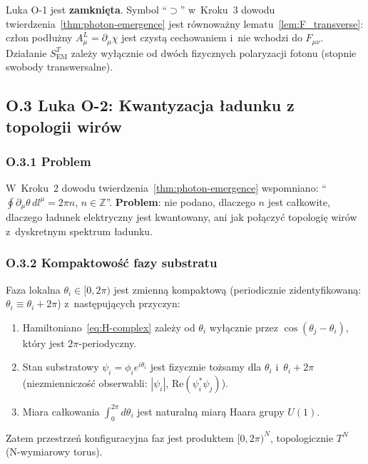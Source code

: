 \begin{uwaga}
Luka O-1 jest \textbf{zamknięta}. Symbol ``$\supset$'' w~Kroku~3
dowodu twierdzenia~\ref{thm:photon-emergence} jest równoważny
lematu~\ref{lem:F_transverse}: człon podłużny $A_\mu^L = \partial_\mu\chi$
jest czystą cechowaniem i~nie wchodzi do $F_{\mu\nu}$.
Działanie $S_\mathrm{EM}^T$ zależy wyłącznie od dwóch fizycznych
polaryzacji fotonu (stopnie swobody transwersalne).
\end{uwaga}

\subsection*{O.3 Luka O-2: Kwantyzacja ładunku z topologii wirów}
\label{ssec:charge_quant}

\subsubsection*{O.3.1 Problem}

W~Kroku~2 dowodu twierdzenia~\ref{thm:photon-emergence} wspomniano:
``$\oint\partial_\mu\theta\,dl^\mu = 2\pi n$, $n\in\mathbb{Z}$''.
\textbf{Problem}: nie podano, dlaczego $n$ jest całkowite,
dlaczego ładunek elektryczny jest kwantowany, ani jak
połączyć topologię wirów z~dyskretnym spektrum ładunku.

\subsubsection*{O.3.2 Kompaktowość fazy substratu}

\begin{lemat}
\label{lem:compact_phase}
Faza lokalna $\theta_i \in [0, 2\pi)$ jest zmienną kompaktową
(periodicznie zidentyfikowaną: $\theta_i \equiv \theta_i + 2\pi$)
z~następujących przyczyn:
\begin{enumerate}
  \item Hamiltoniano~\eqref{eq:H-complex} zależy od $\theta_i$
        wyłącznie przez $\cos(\theta_j - \theta_i)$, który jest
        $2\pi$-periodyczny.
  \item Stan substratowy $\psi_i = \phi_i e^{i\theta_i}$ jest
        fizycznie tożsamy dla $\theta_i$ i~$\theta_i + 2\pi$
        (niezmienniczość obserwabli: $|\psi_i|$, $\mathrm{Re}(\psi_i^*\psi_j)$).
  \item Miara całkowania $\int_0^{2\pi} d\theta_i$ jest naturalną
        miarą Haara grupy $U(1)$.
\end{enumerate}
Zatem przestrzeń konfiguracyjna faz jest produktem $[0,2\pi)^N$,
topologicznie $T^N$ (N-wymiarowy torus).
\end{lemat}

